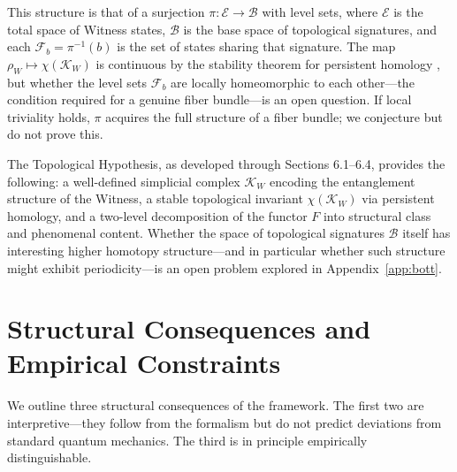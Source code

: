 \documentclass[12pt, a4paper]{article}
\begin{document}
This structure is that of a surjection $\pi: \mathcal{E} \to \mathcal{B}$ with level sets, where $\mathcal{E}$ is the total space of Witness states, $\mathcal{B}$ is the base space of topological signatures, and each $\mathcal{F}_b = \pi^{-1}(b)$ is the set of states sharing that signature. The map $\rho_W \mapsto \chi(\mathcal{K}_W)$ is continuous by the stability theorem for persistent homology \cite{CohenSteiner2007}, but whether the level sets $\mathcal{F}_b$ are locally homeomorphic to each other---the condition required for a genuine fiber bundle---is an open question. If local triviality holds, $\pi$ acquires the full structure of a fiber bundle; we conjecture but do not prove this.

\medskip
\noindent The Topological Hypothesis, as developed through Sections 6.1--6.4, provides the following: a well-defined simplicial complex $\mathcal{K}_W$ encoding the entanglement structure of the Witness, a stable topological invariant $\chi(\mathcal{K}_W)$ via persistent homology, and a two-level decomposition of the functor $F$ into structural class and phenomenal content. Whether the space of topological signatures $\mathcal{B}$ itself has interesting higher homotopy structure---and in particular whether such structure might exhibit periodicity---is an open problem explored in Appendix~\ref{app:bott}.

\section{Structural Consequences and Empirical Constraints}
\label{sec:empirical}

We outline three structural consequences of the framework. The first two are interpretive---they follow from the formalism but do not predict deviations from standard quantum mechanics. The third is in principle empirically distinguishable.
\end{document}
